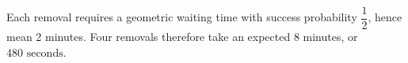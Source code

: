 Each removal requires a geometric waiting time with success probability $\dfrac{1}{2}$, hence mean 2 minutes. Four removals therefore take an expected 8 minutes, or $\boxed{480\text{ seconds}}$.

